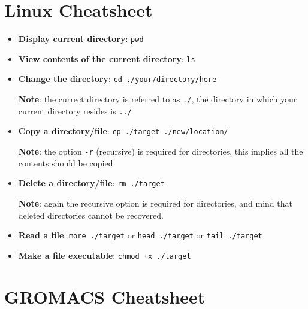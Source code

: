 \documentclass[]{article}
\begin{document}
\appendix
\section*{Linux Cheatsheet}
\setlength\parindent{0pt}

\begin{itemize}
\item \textbf{Display current directory}: \texttt{pwd}

\item \textbf{View contents of the current directory}: \texttt{ls}

\item \textbf{Change the directory}: \texttt{cd ./your/directory/here}

\textbf{Note}: the currect directory is referred to as \texttt{./}, the directory in which your current directory resides is \texttt{../}

\item \textbf{Copy a directory/file}: \texttt{cp ./target ./new/location/}

\textbf{Note}: the option \texttt{-r} (recursive) is required for directories, this implies all the contents should be copied

\item \textbf{Delete a directory/file}: \texttt{rm ./target}

\textbf{Note}: again the recursive option is required for directories, and mind that deleted directories cannot be recovered.

\item \textbf{Read a file}: \texttt{more ./target} or \texttt{head ./target} or \texttt{tail ./target}

\item \textbf{Make a file executable}: \texttt{chmod +x ./target}
\end{itemize}

\newpage
\section*{GROMACS Cheatsheet}
\end{document}
